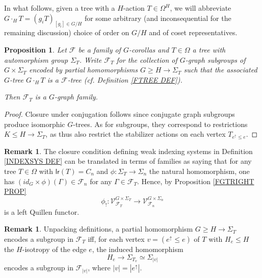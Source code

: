 \documentclass[a4paper,10pt
,draft
]{article}%
\numberwithin{equation}{section}
\numberwithin{figure}{section}
\newtheorem{proposition}[equation]{Proposition}%
\theoremstyle{definition} %
\newtheorem{remark}[equation]{Remark}%
\newcommand{\1}{\ensuremath{\mathbbm 1}}%
\begin{document}
In what follows, given a tree with a $H$-action
$T \in \Omega^H$,
we will abbreviate
$G \cdot_H T = (g_i T)_{[g_i] \in G/H}$
for some arbitrary (and inconsequential for the remaining discussion) choice of order on $G/H$ and of coset representatives.


\begin{proposition}
Let $\mathcal{F}$ be a family of $G$-corollas and $T \in \Omega$ a tree with automorphism group $\Sigma_T$.
	Write $\mathcal{F}_T$ for the collection of $G$-graph subgroups of 
	$G \times \Sigma_T$ encoded by partial homomorphisms
	$G \geq H \to \Sigma_T$ such that the associated $G$-tree
	$G \cdot_H T$ is a $\mathcal{F}$-tree
	(cf. Definition \ref{FTREE DEF}).
	
	Then $\mathcal{F}_T$ is a $G$-graph family.
\end{proposition}

\begin{proof}
	Closure under conjugation follows since conjugate graph subgroups produce isomorphic $G$-trees.
	As for subgroups, they correspond to restrictions $K \leq H \to \Sigma_T$,
	as thus also restrict the stabilizer actions on each vertex $T_{e^{\uparrow} \leq e}$.
\end{proof}

\begin{remark}\label{LRLEFTQUILLEN REM}
The closure condition defining weak indexing systems in Definition \ref{INDEXSYS DEF}
can be translated in terms of families as saying that for any tree $T \in \Omega$ with $\mathsf{lr}(T)=C_n$ and 
$\phi \colon \Sigma_T \to \Sigma_n$ 
the natural homomorphism, one has
$(id_G \times \phi)(\Gamma) \in \mathcal{F}_n$
for any $\Gamma \in \mathcal{F}_{T}$. 
Hence, by
Proposition \ref{FGTRIGHT PROP} 
\[
	\phi_{!}
		\colon
	\mathcal{V}^{G \times \Sigma_T}_{\mathcal{F}_T}
		\to
	\mathcal{V}^{G \times \Sigma_n}
	_{\mathcal{F}_{n}}
\]
is a left Quillen functor.
\end{remark}


\begin{remark}\label{UNPACKFTYPE REM}
Unpacking definitions, a partial homomorphism 
$G \geq H \to \Sigma_T$
encodes a subgroup in $\mathcal{F}_T$
iff, for each vertex $v= ( e^{\uparrow} \leq e)$ of $T$ with 
$H_e \leq H$ the
$H$-isotropy of the edge $e$, the induced homomorphism
\begin{equation}\label{PARTIALHOMEDGE EQ}
H_e \to \Sigma_{T_{v}} \simeq 
\Sigma_{|v|}
\end{equation}
encodes a subgroup in $\mathcal{F}_{|v|}$, where $|v|=|e^{\uparrow}|$.
\end{remark}
\end{document}
